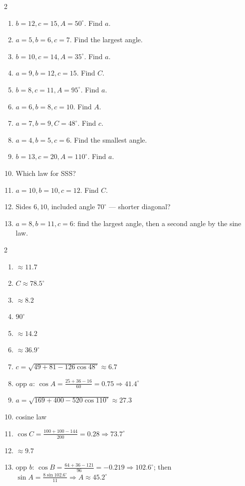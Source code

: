 \documentclass[11pt]{article}
\begin{document}
\begin{recapbox}
\begin{multicols}{2}
\small
\begin{enumerate}[leftmargin=*,itemsep=3pt]
  \item $b=12,c=15,A=50^\circ$. Find $a$.
  \item $a=5,b=6,c=7$. Find the largest angle.
  \item $b=10,c=14,A=35^\circ$. Find $a$.
  \item $a=9,b=12,c=15$. Find $C$.
  \item $b=8,c=11,A=95^\circ$. Find $a$.
  \item $a=6,b=8,c=10$. Find $A$.
  \item $a=7,b=9,C=48^\circ$. Find $c$.
  \item $a=4,b=5,c=6$. Find the smallest angle.
  \item $b=13,c=20,A=110^\circ$. Find $a$.
  \item Which law for SSS?
  \item $a=10,b=10,c=12$. Find $C$.
  \item Sides $6,10$, included angle $70^\circ$ — shorter diagonal?
  \item $a=8,b=11,c=6$: find the largest angle, then a second angle by the sine law.
\end{enumerate}
\end{multicols}
\end{recapbox}

\begin{keybox}
\begin{multicols}{2}
\small
\begin{enumerate}[leftmargin=*,itemsep=3pt]
  \item $\approx11.7$
  \item $C\approx78.5^\circ$
  \item $\approx8.2$
  \item $90^\circ$
  \item $\approx14.2$
  \item $\approx36.9^\circ$
  \item $c=\sqrt{49+81-126\cos48^\circ}\approx6.7$
  \item opp $a$: $\cos A=\tfrac{25+36-16}{60}=0.75\Rightarrow41.4^\circ$
  \item $a=\sqrt{169+400-520\cos110^\circ}\approx27.3$
  \item cosine law
  \item $\cos C=\tfrac{100+100-144}{200}=0.28\Rightarrow73.7^\circ$
  \item $\approx9.7$
  \item opp $b$: $\cos B=\tfrac{64+36-121}{96}=-0.219\Rightarrow102.6^\circ$; then $\sin A=\tfrac{8\sin102.6^\circ}{11}\Rightarrow A\approx45.2^\circ$
\end{enumerate}
\end{multicols}
\end{keybox}
\end{document}

